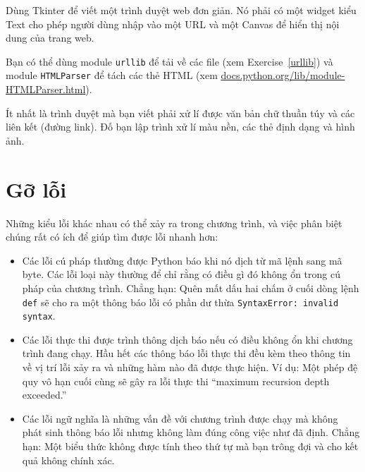 \documentclass[11pt]{book}
\begin{document}
\begin{ex}

Dùng Tkinter để viết một trình duyệt web đơn giản. Nó phải
có một widget kiểu Text cho phép người dùng nhập vào một URL
và một Canvas để hiển thị nội dung của trang web.


Bạn có thể dùng module {\tt urllib} để tải về các file
(xem Exercise~\ref{urllib}) và
module {\tt HTMLParser} để tách các thẻ HTML
(xem \url{docs.python.org/lib/module-HTMLParser.html}).


Ít nhất là trình duyệt mà bạn viết phải xử lí được văn bản chữ thuần túy
và các liên kết (đường link). Đố bạn lập trình xử lí màu nền, các
thẻ định dạng và hình ảnh.

\end{ex}



\appendix

\chapter{Gỡ lỗi}

Những kiểu lỗi khác nhau có thể xảy ra trong chương trình,
và việc phân biệt chúng rất có ích để giúp tìm được lỗi nhanh hơn:

\begin{itemize}

\item Các lỗi cú pháp thường được Python báo khi nó dịch từ 
  mã lệnh sang mã byte. Các lỗi loại này thường để chỉ rằng có 
  điều gì đó không ổn trong cú pháp của chương trình. Chẳng hạn: Quên mất
  dấu hai chấm ở cuối dòng lệnh {\tt def} sẽ cho ra một thông báo lỗi
  có phần dư thừa {\tt SyntaxError: invalid syntax}.

\item Các lỗi thực thi được trình thông dịch báo nếu có điều không ổn
  khi chương trình đang chạy. Hầu hết các thông báo lỗi thực thi đều
  kèm theo thông tin về vị trí lỗi xảy ra và những hàm nào đã được
  thực hiện. Ví dụ: Một phép đệ quy vô hạn cuối cùng sẽ 
  gây ra lỗi thực thi ``maximum recursion depth exceeded.''

\item Các lỗi ngữ nghĩa là những vấn đề với chương trình được chạy mà 
  không phát sinh thông báo lỗi nhưng không làm đúng công việc như đã định. Chẳng hạn:
  Một biểu thức không được tính theo thứ tự mà bạn trông đợi và cho kết quả
  không chính xác.

\end{itemize}
\end{document}
